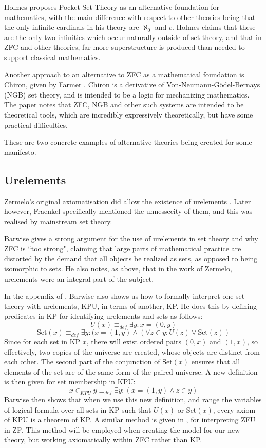 \documentclass[12pt]{article}
\theoremstyle{definition}
\begin{document}
Holmes proposes Pocket Set Theory \cite{pocket} as an alternative foundation for mathematics, with the main difference with respect to other theories being that the only infinite cardinals in his theory are $\aleph_0$ and $c$.
Holmes claims that these are the only two infinities which occur naturally outside of set theory, and that in ZFC and other theories, far more superstructure is produced than needed to support classical mathematics.

Another approach to an alternative to ZFC as a mathematical foundation is Chiron, given by Farmer \cite{chiron}. Chiron is a derivative of Von-Neumann-G\"odel-Bernays (NGB) set theory, and is intended to be a logic for mechanizing mathematics. The paper notes that ZFC, NGB and other such systems are intended to be theoretical tools, which are incredibly expressively theoretically, but have some practical difficulties.

These are two concrete examples of alternative theories being created for some manifesto.

\subsection{Urelements}
Zermelo's original axiomatisation did allow the existence of urelements \cite{zermelo}.
Later however, Fraenkel specifically mentioned the unnessecity of them, and this was realised by mainstream set theory.

Barwise \cite{barwise} gives a strong argument for the use of urelements in set theory and why ZFC is ``too strong", claiming that large parts of mathematical practice are distorted by the demand that all objects be realized as sets, as opposed to being isomorphic to sets.
He also notes, as above, that in the work of Zermelo, urelements were an integral part of the subject.

In the appendix of \cite{barwise}, Barwise also shows us how to formally interpret one set theory with urelements, KPU, in terms of another, KP.
He does this by defining predicates in KP for identifying urelements and sets as follows:
$$U(x) \equiv_{def} \exists y: x = (0,y)$$
$$\text{Set}(x) \equiv_{def} \exists y:(x = (1,y) \wedge (\forall z\in y: U(z) \vee \text{Set}(z))$$
Since for each set in KP $x$, there will exist ordered pairs $(0,x)$ and $(1,x)$, so effectively, two copies of the universe are created, whose objects are distinct from each other.
The second part of the conjunction of $\text{Set}(x)$ ensures that all elements of the set are of the same form of the paired universe.
A new definition is then given for set membership in KPU:
$$x\in_{KPU} y \equiv_{def} \exists y: (x=(1,y) \wedge z\in y)$$
Barwise then shows that when we use this new definition, and range the variables of logical formula over all sets in KP such that $U(x)$ or $\text{Set}(x)$, every axiom of KPU is a theorem of KP. A similar method is given in \cite{lowe}, for interpreting ZFU in ZF.
This method will be employed when creating the model for our new theory, but working axiomatically within ZFC rather than KP.
\end{document}
